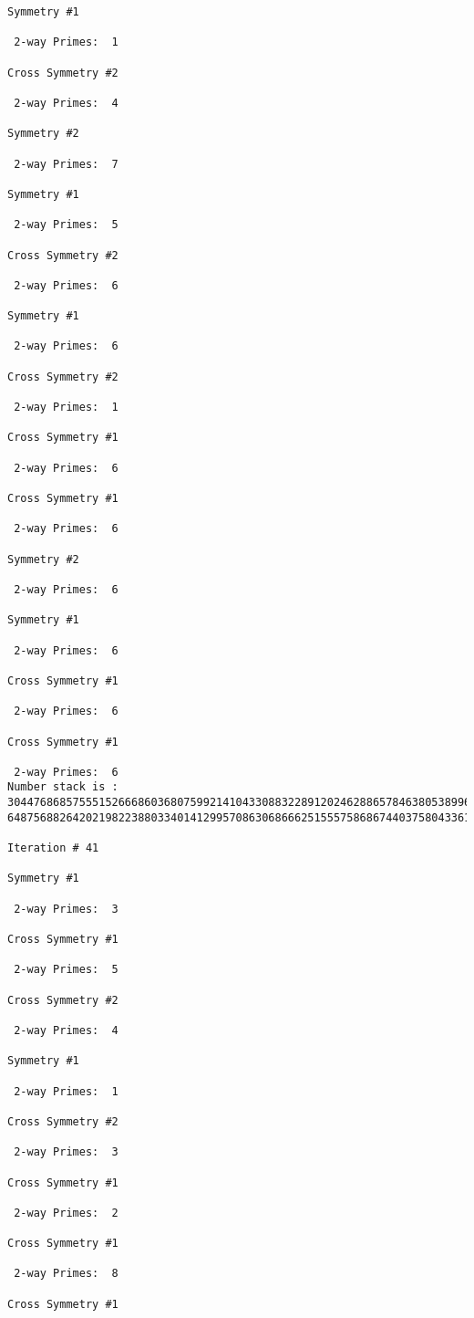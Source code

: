 \begin{verbatim}
Symmetry #1

 2-way Primes: 	1

Cross Symmetry #2

 2-way Primes: 	4

Symmetry #2

 2-way Primes: 	7

Symmetry #1

 2-way Primes: 	5

Cross Symmetry #2

 2-way Primes: 	6

Symmetry #1

 2-way Primes: 	6

Cross Symmetry #2

 2-way Primes: 	1

Cross Symmetry #1

 2-way Primes: 	6

Cross Symmetry #1

 2-way Primes: 	6

Symmetry #2

 2-way Primes: 	6

Symmetry #1

 2-way Primes: 	6

Cross Symmetry #1

 2-way Primes: 	6

Cross Symmetry #1

 2-way Primes: 	6
Number stack is :
30447686857555152666860368075992141043308832289120246288657846380538996794608835958544046240163340857
64875688264202198223880334014129957086306866625155575868674403758043361042640445859538806497699835083

Iteration #	41

Symmetry #1

 2-way Primes: 	3

Cross Symmetry #1

 2-way Primes: 	5

Cross Symmetry #2

 2-way Primes: 	4

Symmetry #1

 2-way Primes: 	1

Cross Symmetry #2

 2-way Primes: 	3

Cross Symmetry #1

 2-way Primes: 	2

Cross Symmetry #1

 2-way Primes: 	8

Cross Symmetry #1


\end{verbatim}
